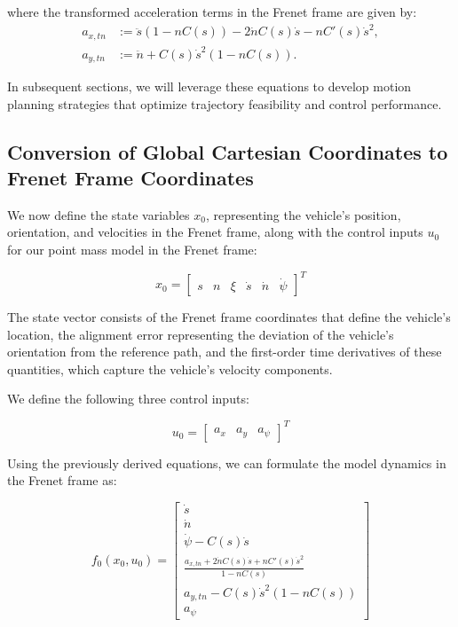 where the transformed acceleration terms in the Frenet frame are given by:
\begin{align}
	a_{x,tn} & := \ddot{s}(1 - nC(s)) - 2\dot{n}
	C(s)\dot{s} - nC'(s)\dot{s}^2, \label{def:axtn} \\ a_{y,tn} & := \ddot{n} + C(s)\dot{s}^2(1 - nC(s)).
	   \label{def:aytn}
\end{align}

In subsequent sections, we will leverage these equations to develop motion planning strategies that optimize trajectory feasibility and control
performance.

\subsection{Conversion of Global Cartesian Coordinates to Frenet Frame Coordinates} \label{subsec:pm_conversion_of_cartesian_to_frenet}

We now define the state variables $x_0$, representing the vehicle's position, orientation, and velocities in the Frenet frame, along with the control inputs $u_0$ for our point mass model in the Frenet frame:

\begin{equation}
	x_0 = \begin{bmatrix}
		s       &
		n       &
		\xi     &
		\dot{s} &
		\dot{n} &
		\dot{\psi}
	\end{bmatrix}^T
\end{equation}

The state vector consists of the Frenet frame coordinates that define the vehicle's location, the alignment error representing the deviation of the
vehicle's orientation from the reference path, and the first-order time derivatives of these quantities, which capture the vehicle's velocity
components.

We define the following three control inputs:

\begin{equation}
	u_0 = \begin{bmatrix}
		a_{x} &
		a_{y} &
		a_\psi
	\end{bmatrix}^T
\end{equation}

Using the previously derived equations, we can formulate the model dynamics in the Frenet frame as:

\begin{equation}
	\label{eq:frenet_frame_pm_dynamics_0}
	f_0(x_0, u_0) = \begin{bmatrix}
		\dot{s}                                  \\
		\dot{n}                                  \\
		\dot{\psi} - C(s)\dot{s}                 \\
		\frac{a_{x,tn} + 2\dot{n}
		C(s)\dot{s}+nC'(s)\dot{s}^2} { 1-nC(s) } \\ a_{y,tn} - C(s)\dot{s}^2(1-nC(s)) \\ a_\psi\end{bmatrix} \end{equation}

